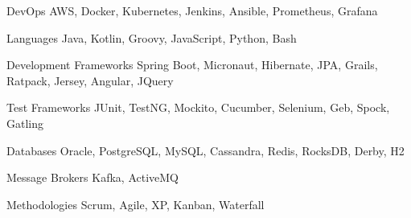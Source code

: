 
\begin{cvskills}

  \cvskill
    {DevOps} %
    {AWS, Docker, Kubernetes, Jenkins, Ansible, Prometheus, Grafana} %

  \cvskill
    {Languages} %
    {Java, Kotlin, Groovy, JavaScript, Python, Bash} %
    
  \cvskill
    {Development Frameworks} %
    {Spring Boot, Micronaut, Hibernate, JPA, Grails, Ratpack, Jersey, Angular, JQuery} %
    
  \cvskill
    {Test Frameworks} %
    {JUnit, TestNG, Mockito, Cucumber, Selenium, Geb, Spock, Gatling} %

  \cvskill
    {Databases} %
    {Oracle, PostgreSQL, MySQL, Cassandra, Redis, RocksDB, Derby, H2} %

  \cvskill
    {Message Brokers} %
    {Kafka, ActiveMQ} %
    
  \cvskill
    {Methodologies} %
    {Scrum, Agile, XP, Kanban, Waterfall} %

\end{cvskills}
